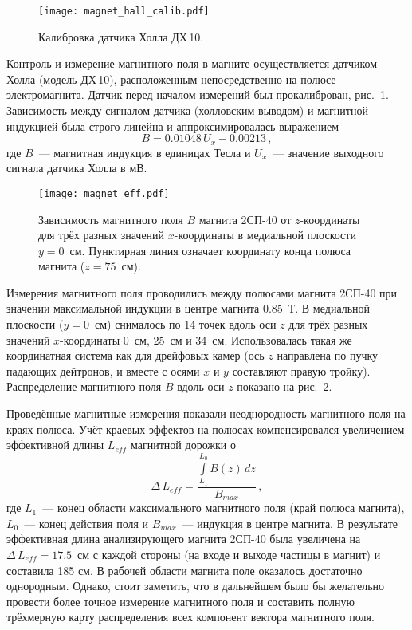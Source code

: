 \begin{figure}[h]
  \centering
  \texttt{[image: magnet\_hall\_calib.pdf]}
  \caption{Калибровка датчика Холла ДХ\,10.}
  \label{fig:magnet_hall_calib}
\end{figure}

Контроль и измерение магнитного поля в магните осуществляется датчиком Холла
(модель ДХ\,10), расположенным непосредственно на полюсе электромагнита. Датчик
перед началом измерений был прокалиброван, рис.~\ref{fig:magnet_hall_calib}.
Зависимость между сигналом датчика (холловским выводом) и магнитной индукцией
была строго линейна и аппроксимировалась выражением
\begin{equation}
  B = 0.01048\,U_{x} - 0.00213\,,
\end{equation}
где $B$~--- магнитная индукция в единицах Тесла и $U_{x}$~--- значение выходного
сигнала датчика Холла в мВ.

\begin{figure}[h]
  \centering
  \texttt{[image: magnet\_eff.pdf]}
  \caption{Зависимость магнитного поля $B$ магнита 2СП-40 от $z$-координаты
    для трёх разных значений $x$-координаты в медиальной плоскости $y=0$~см.
    Пунктирная линия означает координату конца полюса магнита ($z=75$~см).}
  \label{fig:magnet_eff}
\end{figure}

Измерения магнитного поля проводились между полюсами магнита 2СП-40 при значении
максимальной индукции в центре магнита 0.85~Т. В медиальной плоскости ($y=0$~см)
снималось по 14 точек вдоль оси $z$ для трёх разных значений $x$-координаты
0~см, 25~см и 34~см. Использовалась такая же координатная система как для
дрейфовых камер (ось $z$ направлена по пучку падающих дейтронов, и вместе с
осями $x$ и $y$ составляют правую тройку). Распределение магнитного поля $B$
вдоль оси $z$ показано на рис.~\ref{fig:magnet_eff}.

Проведённые магнитные измерения показали неоднородность магнитного поля на краях
полюса. Учёт краевых эффектов на полюсах компенсировался увеличением эффективной
длины $L_{eff}$ магнитной дорожки о
\begin{equation}
  \Delta\,L_{eff} = \frac{\int\limits_{L_{1}}^{L_{0}} B(z)\,dz}{B_{max}}\,,
\end{equation}
где $L_{1}$~--- конец области максимального магнитного поля (край полюса
магнита), $L_{0}$~--- конец действия поля и $B_{max}$~--- индукция в центре
магнита. В результате эффективная длина анализирующего магнита 2СП-40 была
увеличена на $\Delta\,L_{eff} = 17.5$~см с каждой стороны (на входе и выходе
частицы в магнит) и составила 185 см. В рабочей области магнита поле оказалось
достаточно однородным. Однако, стоит заметить, что в дальнейшем было бы
желательно провести более точное измерение магнитного поля и составить полную
трёхмерную карту распределения всех компонент вектора магнитного поля.

